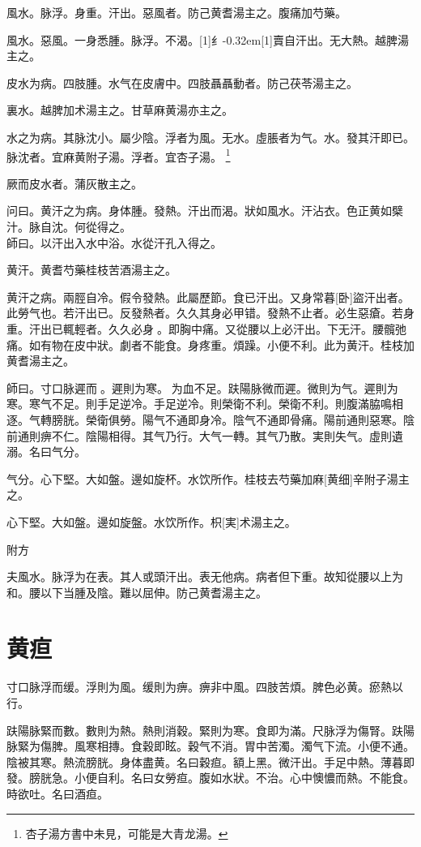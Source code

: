 \documentclass[oneside,b4paper]{ctexbook}
\begin{document}
\begin{flushleft}
風水。脉浮。身重。汗出。惡風者。防己黄耆湯主之。腹痛加芍藥。

風水。惡風。一身悉腫。脉浮。不渴。{\hbox{\scalebox{0.6}[1]{纟}\kern-0.32em\scalebox{0.7}[1]{賣}}}自汗出。无大熱。越脾湯主之。

皮水为病。四肢腫。水气在皮膚中。四肢聶聶動者。防己茯苓湯主之。

裏水。越脾加术湯主之。甘草麻黄湯亦主之。

水之为病。其脉沈小。屬少陰。浮者为風。无水。虛脹者为气。水。發其汗即已。脉沈者。宜麻黄附子湯。浮者。宜杏子湯。
\footnote{杏子湯方書中未見，可能是大青龙湯。}

厥而皮水者。蒲灰散主之。

问曰。黄汗之为病。身体腫。發熱。汗出而渴。狀如風水。汗沾衣。色正黄如檗汁。脉自沈。何從得之。\\
師曰。以汗出入水中浴。水從汗孔入得之。

黄汗。黄耆芍藥桂枝苦酒湯主之。

黄汗之病。兩脛自冷。假令發熱。此屬歷節。食已汗出。又身常暮[卧]盜汗出者。此勞气也。若汗出已。反發熱者。久久其身必甲错。發熱不止者。必生惡瘡。若身重。汗出已輒輕者。久久必身{𥆧}。即胸中痛。又從腰以上必汗出。下无汗。腰髖弛痛。如有物在皮中狀。劇者不能食。身疼重。煩躁。小便不利。此为黄汗。桂枝加黄耆湯主之。

師曰。寸口脉遲而{𬈧}。遲則为寒。{𬈧}为血不足。趺陽脉微而遲。微則为气。遲則为寒。寒气不足。則手足逆冷。手足逆冷。則榮衛不利。榮衛不利。則腹滿脇鳴相逐。气轉膀胱。榮衛俱勞。陽气不通即身冷。陰气不通即骨痛。陽前通則惡寒。陰前通則痹不仁。陰陽相得。其气乃行。大气一轉。其气乃散。実則失气。虛則遺溺。名曰气分。

气分。心下堅。大如盤。邊如旋杯。水饮所作。桂枝去芍藥加麻[黄细]辛附子湯主之。

心下堅。大如盤。邊如旋盤。水饮所作。枳[実]术湯主之。

附方

夫風水。脉浮为在表。其人或頭汗出。表无他病。病者但下重。故知從腰以上为和。腰以下当腫及陰。難以屈伸。防己黄耆湯主之。

\chapter{黄疸}

寸口脉浮而缓。浮則为風。缓則为痹。痹非中風。四肢苦煩。脾色必黄。瘀熱以行。

趺陽脉緊而數。數則为熱。熱則消穀。緊則为寒。食即为滿。尺脉浮为傷腎。趺陽脉緊为傷脾。風寒相摶。食穀即眩。穀气不消。胃中苦濁。濁气下流。小便不通。陰被其寒。熱流膀胱。身体盡黄。名曰穀疸。額上黑。微汗出。手足中熱。薄暮即發。膀胱急。小便自利。名曰女勞疸。腹如水狀。不治。心中懊憹而熱。不能食。時欲吐。名曰酒疸。


\end{flushleft}
\end{document}
